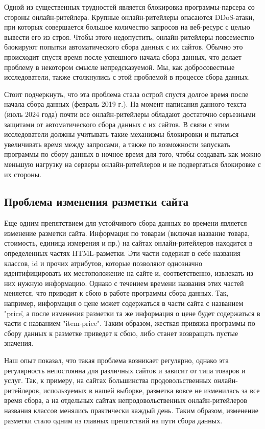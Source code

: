 Одной из существенных трудностей является блокировка программы-парсера со стороны онлайн-ритейлера. Крупные онлайн-ритейлеры опасаются DDoS-атаки, при которых совершается большое количество запросов на веб-ресурс с целью вывести его из строя. Чтобы этого недопустить, онлайн-ритейлеры повсеместно блокируют попытки автоматического сбора данных с их сайтов. Обычно это происходит спустя время после успешного начала сбора данных, что делает проблему в некотором смысле непредсказуемой. Мы, как добросовестные исследователи, также столкнулись с этой проблемой в процессе сбора данных.

Стоит подчеркнуть, что эта проблема стала острой спустя долгое время после начала сбора данных (февраль 2019 г.). На момент написания данного текста (июль 2024 года) почти все онлайн-ритейлеры обладают достаточно серьезными защитами от автоматического сбора данных с их сайтов. В связи с этим исследователи должны учитывать такие механизмы блокировки и пытаться увеличивать время между запросами, а также по возможности запускать программы по сбору данных в ночное время для того, чтобы создавать как можно меньшую нагрузку на серверы онлайн-ритейлеров и не подвергаться блокировке с их стороны.

\subsection{Проблема изменения разметки сайта}\label{subsec:ch2/sec3/sub2}

Еще одним препятствием для устойчивого сбора данных во времени является изменение разметки сайта. Информация по товарам (включая название товара, стоимость, единица измерения и пр.) на сайтах онлайн-ритейлеров находится в определенных частях HTML-разметки. Эти части содержат в себе названия классов, id и прочих атрибутов, которые позволяют однозначно идентифицировать их местоположение на сайте и, соответственно, извлекать из них нужную информацию. Однако с течением времени названия этих частей меняется, что приводит к сбою в работе программы сбора данных. Так, например, информация о цене может содержаться в части сайта с названием "price\", а после изменения разметки та же информация о цене будет содержаться в части с названием "item-price". Таким образом, жесткая привязка программы по сбору данных к разметке приведет к сбою, либо станет возвращать пустые значения.

Наш опыт показал, что такая проблема возникает регулярно, однако эта регулярность непостоянна для различных сайтов и зависит от типа товаров и услуг. Так, к примеру, на сайтах большинства продовольственных онлайн-ритейлеров, используемых в нашей выборке, разметка вовсе не изменилась за все время сбора, а на отдельных сайтах непродовольственных онлайн-ритейлеров названия классов менялись практически каждый день. Таким образом, изменение разметки стало одним из главных препятствий на пути сбора данных.

